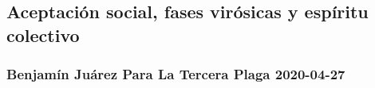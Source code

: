 \subsection{%
Aceptación social, fases virósicas y espíritu colectivo}\label{cometas-celestes-viruxf3sicas-y-cabezas-colectivas}

\subsubsection{Benjamín Juárez \textbar{} Para La Tercera Plaga \textbar{}
2020-04-27}\label{benjamuxedn-juuxe1rez-para-la-tercera-plaga-2020-04-27}